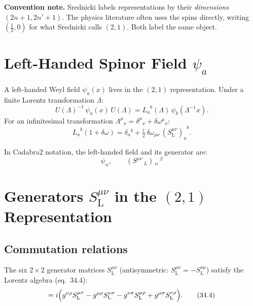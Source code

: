 \documentclass[12pt]{article}
\theoremstyle{remark}
\begin{document}
\noindent\textbf{Convention note.}  Srednicki labels representations by their
\emph{dimensions} $(2n{+}1, 2n'{+}1)$.  The physics literature often uses
the spins directly, writing $(\tfrac{1}{2},0)$ for what Srednicki calls $(2,1)$.
Both label the same object.

\section{Left-Handed Spinor Field \texorpdfstring{$\psi_a$}{psi\_a}}

A left-handed Weyl field $\psi_a(x)$ lives in the $(2,1)$ representation.
Under a finite Lorentz transformation $\Lambda$:
\begin{equation}
  U(\Lambda)^{-1}\,\psi_a(x)\,U(\Lambda)
  = {L_a}^b(\Lambda)\,\psi_b(\Lambda^{-1}x).
  \tag{34.1}
\end{equation}
For an infinitesimal transformation
${\Lambda^\mu}{}_\nu = \delta^\mu{}_\nu + \delta\omega^\mu{}_\nu$:
\begin{equation}
  {L_a}^b(1{+}\delta\omega)
  = \delta_a{}^b + \tfrac{i}{2}\,\delta\omega_{\mu\nu}\,
    {(S^{\mu\nu}_{\mathrm{L}})_a}^b.
  \tag{34.3}
\end{equation}

\noindent In Cadabra2 notation, the left-handed field and its generator are:
\[
  \psi_{\alpha},
  \qquad
  \left(S^{\mu \nu}\,_{L} \right)\,_{\alpha}\,^{\beta}
\]

\section{Generators \texorpdfstring{$S^{\mu\nu}_{\mathrm{L}}$}{S\^{}munu\_L}
         in the $(2,1)$ Representation}

\subsection{Commutation relations}

The six $2\times 2$ generator matrices $S^{\mu\nu}_{\mathrm{L}}$
(antisymmetric: $S^{\mu\nu}_{\mathrm{L}} = -S^{\nu\mu}_{\mathrm{L}}$)
satisfy the Lorentz algebra (eq.~34.4):
\begin{equation}
  [S^{\mu\nu}_{\mathrm{L}},\, S^{\rho\sigma}_{\mathrm{L}}]
  = i\Bigl(
      g^{\nu\rho} S^{\mu\sigma}_{\mathrm{L}}
    - g^{\mu\rho} S^{\nu\sigma}_{\mathrm{L}}
    - g^{\nu\sigma} S^{\mu\rho}_{\mathrm{L}}
    + g^{\mu\sigma} S^{\nu\rho}_{\mathrm{L}}
    \Bigr).
  \tag{34.4}
\end{equation}
\end{document}
